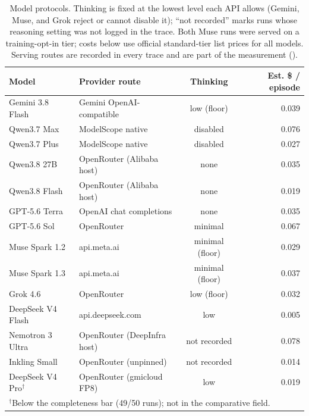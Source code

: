 \documentclass{article}
\begin{document}
\begin{table}
\centering
\caption{Model protocols. Thinking is fixed at the lowest level each API allows
(Gemini, Muse, and Grok reject or cannot disable it); ``not recorded'' marks
runs whose reasoning setting was not logged in the trace. Both Muse runs were served
on a training-opt-in tier; costs below use official standard-tier list prices for all
models. Serving routes are recorded in every trace and are part of the measurement
().}
\label{tab:protocols}
\small
\begin{tabular}{llcr}
\toprule
Model & Provider route & Thinking & Est. \$ / episode \\
\midrule
Gemini 3.8 Flash & Gemini OpenAI-compatible & low (floor) & 0.039 \\
Qwen3.7 Max & ModelScope native & disabled & 0.076 \\
Qwen3.7 Plus & ModelScope native & disabled & 0.027 \\
Qwen3.8 27B & OpenRouter (Alibaba host) & none & 0.035 \\
Qwen3.8 Flash & OpenRouter (Alibaba host) & none & 0.019 \\
GPT-5.6 Terra & OpenAI chat completions & none & 0.035 \\
GPT-5.6 Sol & OpenRouter & minimal & 0.067 \\
Muse Spark 1.2 & api.meta.ai & minimal (floor) & 0.029 \\
Muse Spark 1.3 & api.meta.ai & minimal (floor) & 0.037 \\
Grok 4.6 & OpenRouter & low (floor) & 0.032 \\
DeepSeek V4 Flash & api.deepseek.com & low & 0.005 \\
Nemotron 3 Ultra & OpenRouter (DeepInfra host) & not recorded & 0.078 \\
Inkling Small & OpenRouter (unpinned) & not recorded & 0.014 \\
DeepSeek V4 Pro$^\dagger$ & OpenRouter (gmicloud FP8) & low & 0.019 \\
\midrule
\multicolumn{4}{l}{\footnotesize $^\dagger$Below the completeness bar (49/50 runs); not in the comparative field.} \\
\bottomrule
\end{tabular}
\end{table}
\end{document}
